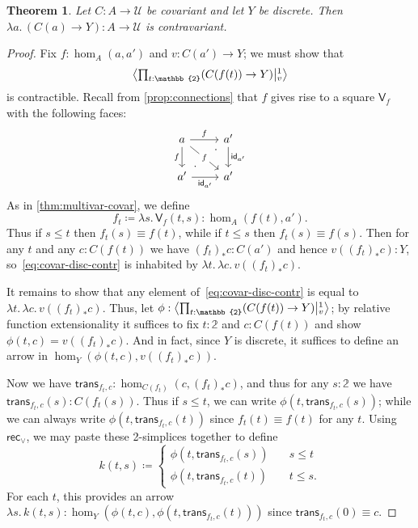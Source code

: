 \documentclass{amsart}
\theoremstyle{plain}
\newtheorem{thm}{Theorem}[section]
\theoremstyle{definition}
\theoremstyle{remark}
\numberwithin{equation}{section}
\newcommand{\exten}[4]{\left\langle\mathchoice{\textstyle\prod_{#1}}{\textstyle\prod_{#1}}{\scriptstyle\prod_{#1}}{\scriptscriptstyle\prod_{#1}} #2 \middle|^{#3}_{#4}\right\rangle}
\newcommand{\jdeq}{\equiv}
\newcommand{\defeq}{\coloneqq}
\newcommand{\univtype}{\mathcal{U}}
\newcommand{\rec}{\mathsf{rec}}
\newcommand{\connmax}[1]{\mathsf{V}_{#1}}
\newcommand{\lam}[1]{\lambda #1.\,}
\newcommand{\two}{\mathbb{2}}
\newcommand{\idarr}[1]{\mathsf{id}_{#1}}
\newcommand{\covtr}[1]{{#1}_*}  %
\newcommand{\istrans}[2]{\mathsf{trans}_{#1,#2}}
\begin{document}
\begin{thm}\label{thm:covar-into-discrete}
  Let $C:A\to\univtype$ be covariant and let $Y$ be discrete.
  Then $\lam{a} (C(a)\to Y): A \to \univtype$ is contravariant.
\end{thm}
\begin{proof}
  Fix $f:\hom_A(a,a')$ and $v:C(a')\to Y$; we must show that
  \begin{equation}
    \exten{t:\two}{(C(f(t))\to Y)}{1}{v}\label{eq:covar-disc-contr}
  \end{equation}
  is contractible.
  Recall from \cref{prop:connections} that $f$ gives rise to a square $\connmax f$ with the following faces:
  \[
  \begin{tikzcd}
    a \arrow[r, "f"] \arrow[dr, "f" description] \arrow[d, "f"'] & a' \arrow[d, "\idarr{a'}"] \\ a' \arrow[r, "\idarr{a'}"']  \arrow[ur, phantom, "\cdot" very near start, "\cdot" very near end] & a'
  \end{tikzcd}
  \]
  As in \cref{thm:multivar-covar}, we define
  \[ f_t \defeq \lam{s} \connmax f(t,s) : \hom_A(f(t),a'). \]
  Thus if $s\le t$ then $f_t(s)\jdeq f(t)$, while if $t\le s$ then $f_t(s)\jdeq f(s)$.
  Then for any $t$ and any $c:C(f(t))$ we have $\covtr{(f_t)} c : C(a')$ and hence $v(\covtr{(f_t)} c) : Y$, so~\eqref{eq:covar-disc-contr} is inhabited by $\lam{t} \lam{c} v(\covtr{(f_t)} c)$.

  It remains to show that any element of~\eqref{eq:covar-disc-contr} is equal to $\lam{t} \lam{c} v(\covtr{(f_t)} c)$.
  Thus, let $\phi:\exten{t:\two}{(C(f(t))\to Y)}{1}{v}$; by relative function extensionality it suffices to fix $t:\two$ and $c:C(f(t))$ and show $\phi(t,c) = v(\covtr{(f_t)} c)$. And in fact, since $Y$ is discrete, it suffices to define an arrow in $\hom_Y(\phi(t,c), v((f_t)_*c))$.

  Now we have $\istrans{f_t}{c} : \hom_{C(f_t)}(c,\covtr{(f_t)} c)$, and thus for any $s:\two$ we have $\istrans{f_t}{c}(s) : C(f_t(s))$.
  Thus if $s\le t$, we can write $\phi(t,\istrans{f_t}{c}(s))$; while we can always write $\phi(t,\istrans{f_t}{c}(t))$ since $f_t(t)\jdeq f(t)$ for any $t$.
    Using $\rec_\lor$, we may paste these 2-simplices together to define
  \[
  k(t,s) \defeq
  \begin{cases}
    \phi(t,\istrans{f_t}{c}(s)) &\quad s \le t \\
    \phi(t,\istrans{f_t}{c}(t)) &\quad t \le s.
  \end{cases}
  \]
   For each $t$, this provides an arrow $\lam{s} k(t,s): \hom_Y(\phi(t,c),    \phi(t,\istrans{f_t}{c}(t)))$ 
     since $\istrans{f_t}{c}(0)\jdeq c$.


\end{proof}
\end{document}
